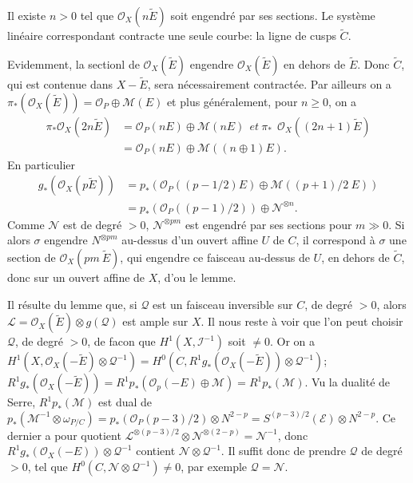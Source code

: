 \begin{lemme*}
Il existe $n>0$ tel que $\mathscr{O}_{X}(n\widetilde{E})$ soit
engendr\'e par ses sections. Le syst\`eme lin\'eaire correspondant
contracte une seule courbe: la ligne de cusps $\widetilde{C}$.
\end{lemme*}

Evidemment, la sectionl de $\mathscr{O}_{X}(\widetilde{E})$ engendre
$\mathscr{O}_{X}(\widetilde{E})$ en dehors de $\widetilde{E}$. Donc
$\widetilde{C}$, qui est contenue dans $X-\widetilde{E}$, sera
n\'ecessairement contract\'ee. Par ailleurs on a
$\pi_{*}(\mathscr{O}_{X}(\widetilde{E}))=\mathscr{O}_{P}\oplus \mathscr{M}(E)$
et plus g\'en\'eralement, pour $n\geq 0$, on a
\begin{align*}
\pi_{*}\mathscr{O}_{X}(2n\widetilde{E})
&= \mathscr{O}_{P}(nE)\oplus \mathscr{M}(nE)~~et~\pi_{*}~~\mathscr{O}_{X}((2n+1)\widetilde{E})\\
&= \mathscr{O}_{P}(nE)\oplus \mathscr{M}((n\oplus 1)E).
\end{align*}
En particulier
\begin{align*}
g_{*}(\mathscr{O}_{X}(p\widetilde{E})) &=
p_{*}(\mathscr{O}_{P}((p-1/2)E)\oplus \mathscr{M}((p+1)/2~E))\\
&= p_{*}(\mathscr{O}_{P}((p-1)/2))\oplus \mathscr{N}^{\otimes n}.
\end{align*}
Comme $\mathscr{N}$ est de degr\'e $>0$, $\mathscr{N}^{\otimes pm}$
est engendr\'e par ses sections pour $m\gg 0$. Si alors $\sigma$
engendre $N^{\otimes pm}$ au-dessus d'un ouvert affine $U$ de $C$, il
correspond \`a $\sigma$ une section de
$\mathscr{O}_{X}(pm \ \widetilde{E})$, qui engendre ce faisceau
au-dessus de $U$, en dehors de $\widetilde{C}$, donc sur un ouvert
affine de $X$, d'ou le lemme.

Il r\'esulte du lemme que, si $\mathscr{Q}$ est un faisceau inversible
sur $C$, de degr\'e $>0$, alors
$\mathscr{L}=\mathscr{O}_{X}(\widetilde{E})\otimes g(\mathscr{Q})$ est
ample sur $X$. Il nous reste \`a voir que l'on peut choisir
$\mathscr{Q}$, de degr\'e $>0$, de facon que
$H^{1}(X,\mathscr{I}^{-1})$ soit $\neq 0$. Or on a
$H^{1}(X,\mathscr{O}_{X}(-\widetilde{E})\otimes \mathscr{Q}^{-1})=H^{0}(C,R^{1}g_{*}(\mathscr{O}_{X}(-\widetilde{E}))\otimes \mathscr{Q}^{-1})$;
$R^{1}g_{*}(\mathscr{O}_{X}(-\widetilde{E}))=R^{1}p_{*}(\mathscr{O}_{p}(-E)\oplus \mathscr{M})=R^{1}p_{*}(\mathscr{M})$. Vu\pageoriginale
la dualit\'e de Serre, $R^{1}p_{*}(\mathscr{M})$ est dual de
$p_{*}(\mathscr{M}^{-1}\otimes \omega_{P/C})=p_{*}(\mathscr{O}_{P}(p-3)/2)\otimes
N^{2-p}=S^{(p-3)/2}(\mathscr{E})\otimes N^{2-p}$. Ce dernier a pour
quotient $\mathscr{L}^{\otimes
(p-3)/2}\otimes \mathscr{N}^{\otimes(2-p)}=\mathscr{N}^{-1}$, donc
$R^{1}g_{*}(\mathscr{O}_{X}(-E))\otimes \mathscr{Q}^{-1}$ contient
$\mathscr{N}\otimes \mathscr{Q}^{-1}$. Il suffit donc de prendre
$\mathscr{Q}$ de degr\'e $>0$, tel que
$H^{0}(C,\mathscr{N}\otimes \mathscr{Q}^{-1})\neq 0$, par exemple
$\mathscr{Q}=\mathscr{N}$. 

